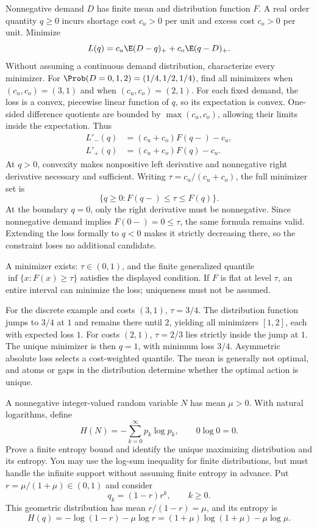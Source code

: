 Nonnegative demand $D$ has finite mean and distribution function $F$. A real order quantity $q\ge0$ incurs shortage cost $c_u>0$ per unit and excess cost $c_o>0$ per unit. Minimize
\[
L(q)=c_u\E(D-q)_++c_o\E(q-D)_+.
\]
Without assuming a continuous demand distribution, characterize every minimizer. For $\Prob(D=0,1,2)=(1/4,1/2,1/4)$, find all minimizers when $(c_u,c_o)=(3,1)$ and when $(c_u,c_o)=(2,1)$.
\solution For each fixed demand, the loss is a convex, piecewise linear function of $q$, so its expectation is convex. One-sided difference quotients are bounded by $\max(c_u,c_o)$, allowing their limits inside the expectation. Thus
\[
\begin{aligned}
L'_-(q)&=(c_u+c_o)F(q-)-c_u,\\
L'_+(q)&=(c_u+c_o)F(q)-c_u.
\end{aligned}
\]
At $q>0$, convexity makes nonpositive left derivative and nonnegative right derivative necessary and sufficient. Writing $\tau=c_u/(c_u+c_o)$, the full minimizer set is
\[
\boxed{\{q\ge0:F(q-)\le\tau\le F(q)\}}.
\]
At the boundary $q=0$, only the right derivative must be nonnegative. Since nonnegative demand implies $F(0-)=0\le\tau$, the same formula remains valid. Extending the loss formally to $q<0$ makes it strictly decreasing there, so the constraint loses no additional candidate.

A minimizer exists: $\tau\in(0,1)$, and the finite generalized quantile $\inf\{x:F(x)\ge\tau\}$ satisfies the displayed condition. If $F$ is flat at level $\tau$, an entire interval can minimize the loss; uniqueness must not be assumed.

For the discrete example and costs $(3,1)$, $\tau=3/4$. The distribution function jumps to $3/4$ at $1$ and remains there until $2$, yielding all minimizers $[1,2]$, each with expected loss $1$. For costs $(2,1)$, $\tau=2/3$ lies strictly inside the jump at $1$. The unique minimizer is then $q=1$, with minimum loss $3/4$.
\insight Asymmetric absolute loss selects a cost-weighted quantile. The mean is generally not optimal, and atoms or gaps in the distribution determine whether the optimal action is unique.

A nonnegative integer-valued random variable $N$ has mean $\mu>0$. With natural logarithms, define
\[
H(N)=-\sum_{k=0}^\infty p_k\log p_k,\qquad 0\log0=0.
\]
Prove a finite entropy bound and identify the unique maximizing distribution and its entropy. You may use the log-sum inequality for finite distributions, but must handle the infinite support without assuming finite entropy in advance.
\solution Put $r=\mu/(1+\mu)\in(0,1)$ and consider
\[
q_k=(1-r)r^k,\qquad k\ge0.
\]
This geometric distribution has mean $r/(1-r)=\mu$, and its entropy is
\[
H(q)=-\log(1-r)-\mu\log r
=(1+\mu)\log(1+\mu)-\mu\log\mu.
\]

